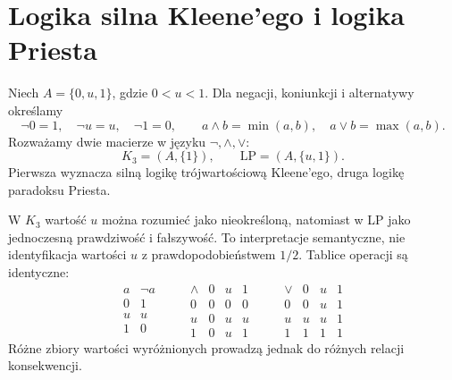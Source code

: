 \section{Logika silna Kleene'ego i logika Priesta}
\begin{definicja}\label{def:ncl-k3-lp}
Niech $A=\{0,u,1\}$, gdzie $0<u<1$.
Dla negacji, koniunkcji i alternatywy określamy
\[
 \neg0=1,\quad \neg u=u,\quad \neg1=0,\qquad
 a\wedge b=\min(a,b),\quad a\vee b=\max(a,b).
\]
Rozważamy dwie macierze w języku $\neg,\wedge,\vee$:
\[
 K_3=(A,\{1\}),\qquad \mathrm{LP}=(A,\{u,1\}).
\]
Pierwsza wyznacza silną logikę trójwartościową
Kleene'ego, druga logikę paradoksu Priesta.
\end{definicja}
W $K_3$ wartość $u$ można rozumieć jako nieokreśloną,
natomiast w LP jako jednoczesną prawdziwość i fałszywość.
To interpretacje semantyczne, nie identyfikacja
wartości $u$ z prawdopodobieństwem $1/2$.
Tablice operacji są identyczne:
\[
\begin{array}{c|c}
 a&\neg a\\\hline
 0&1\\u&u\\1&0
\end{array}
\qquad
\begin{array}{c|ccc}
 \wedge&0&u&1\\\hline
 0&0&0&0\\u&0&u&u\\1&0&u&1
\end{array}
\qquad
\begin{array}{c|ccc}
 \vee&0&u&1\\\hline
 0&0&u&1\\u&u&u&1\\1&1&1&1
\end{array}
\]
Różne zbiory wartości wyróżnionych prowadzą jednak
do różnych relacji konsekwencji.

